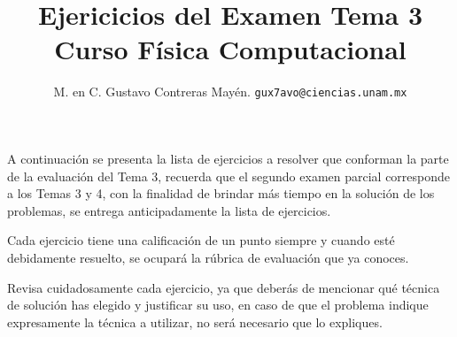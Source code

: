 
\usetikzlibrary{decorations.text}
\usetikzlibrary{patterns, arrows}
\usetikzlibrary{decorations.pathmorphing, decorations.markings}
\usetikzlibrary{matrix}



\title{Ejericicios del Examen Tema 3 \\ {\large Curso Física Computacional}}
\author{M. en C. Gustavo Contreras Mayén. \texttt{gux7avo@ciencias.unam.mx}}

\date{ }


\maketitle
\fontsize{14}{14}\selectfont

A continuación se presenta la lista de ejercicios a resolver que conforman la parte de la evaluación del Tema 3, recuerda que el segundo examen parcial corresponde a los Temas 3 y 4, con la finalidad de brindar más tiempo en la solución de los problemas, se entrega anticipadamente la lista de ejercicios.
\par
Cada ejercicio tiene una calificación de un punto siempre y cuando esté debidamente resuelto, se ocupará la rúbrica de evaluación que ya conoces.
\par
Revisa cuidadosamente cada ejercicio, ya que deberás de mencionar qué técnica de solución has elegido y justificar su uso, en caso de que el problema indique expresamente la técnica a utilizar, no será necesario que lo expliques.

